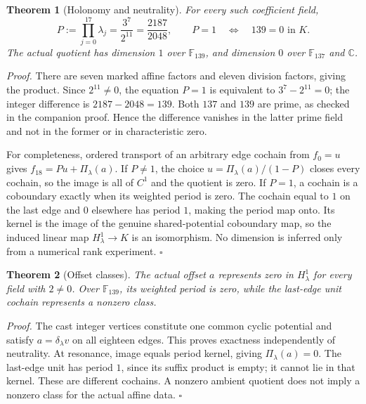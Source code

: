 \documentclass[11pt,letterpaper]{article}
\newcommand{\C}{\mathbb{C}}
\newtheorem{theorem}{Theorem}
\newenvironment{proof}{\noindent\textit{Proof.}}{\hfill\(\square\)}
\begin{document}
\begin{theorem}[Holonomy and neutrality]
For every such coefficient field,
\[
P:=\prod_{j=0}^{17}\lambda_j=\frac{3^7}{2^{11}}=\frac{2187}{2048},
\qquad
P=1\quad\Longleftrightarrow\quad139=0\text{ in }K.
\]
The actual quotient has dimension \(1\) over \(\mathbb F_{139}\), and dimension \(0\) over \(\mathbb F_{137}\) and \(\C\).
\end{theorem}
\begin{proof}
There are seven marked affine factors and eleven division factors, giving the product. Since \(2^{11}\ne0\), the equation \(P=1\) is equivalent to \(3^7-2^{11}=0\); the integer difference is \(2187-2048=139\). Both \(137\) and \(139\) are prime, as checked in the companion proof. Hence the difference vanishes in the latter prime field and not in the former or in characteristic zero.

For completeness, ordered transport of an arbitrary edge cochain from \(f_0=u\) gives \(f_{18}=Pu+\Pi_\lambda(a)\). If \(P\ne1\), the choice \(u=\Pi_\lambda(a)/(1-P)\) closes every cochain, so the image is all of \(C^1\) and the quotient is zero. If \(P=1\), a cochain is a coboundary exactly when its weighted period is zero. The cochain equal to \(1\) on the last edge and \(0\) elsewhere has period \(1\), making the period map onto. Its kernel is the image of the genuine shared-potential coboundary map, so the induced linear map \(H^1_\lambda\to K\) is an isomorphism. No dimension is inferred only from a numerical rank experiment.
\end{proof}

\begin{theorem}[Offset classes]
The actual offset \(a\) represents zero in \(H^1_\lambda\) for every field with \(2\ne0\). Over \(\mathbb F_{139}\), its weighted period is zero, while the last-edge unit cochain represents a nonzero class.
\end{theorem}
\begin{proof}
The cast integer vertices constitute one common cyclic potential and satisfy \(a=\delta_\lambda v\) on all eighteen edges. This proves exactness independently of neutrality. At resonance, image equals period kernel, giving \(\Pi_\lambda(a)=0\). The last-edge unit has period \(1\), since its suffix product is empty; it cannot lie in that kernel. These are different cochains. A nonzero ambient quotient does not imply a nonzero class for the actual affine data.
\end{proof}
\end{document}
